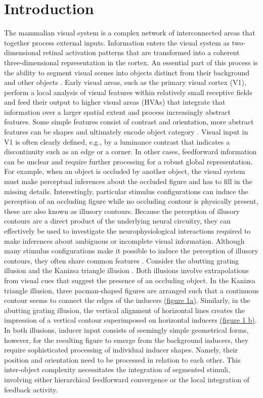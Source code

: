 \documentclass[12pt]{article}
\begin{document}
\section{Introduction}
The mammalian visual system is a complex network of interconnected areas that together process external inputs. Information enters the visual system as two-dimensional retinal activation patterns that are transformed into a coherent three-dimensional representation in the cortex. An essential part of this process is the ability to segment visual scenes into objects distinct from their background and other objects \autocite{kirchbergerEssentialRoleFeedback2020}. Early visual areas, such as the primary visual cortex (V1), perform a local analysis of visual features within relatively small receptive fields and feed their output to higher visual areas (HVAs) that integrate that information over a larger spatial extent and process increasingly abstract features. Some simple features consist of contrast and orientation, more abstract features can be shapes and ultimately encode object category \autocite{ashbridgeEffectImageOrientation2000}. Visual input in V1 is often clearly defined, e.g., by a luminance contrast that indicates a discontinuity such as an edge or a corner. In other cases, feedforward information can be unclear and require further processing for a robust global representation. For example, when an object is occluded by another object, the visual system must make perceptual inferences about the occluded figure and has to fill in the missing details. Interestingly, particular stimulus configurations can induce the perception of an occluding figure while no occluding contour is physically present, these are also known as illusory contours. Because the perception of illusory contours are a direct product of the underlying neural circuitry, they can effectively be used to investigate the neurophysiological interactions required to make inferences about ambiguous or incomplete visual information.
\bigbreak
Although many stimulus configurations make it possible to induce the perception of illusory contours, they often share common features \autocite{palmerLateInfluencesPerceptual2000}. Consider the abutting grating illusion \autocite{sorianoAbuttingGratingIllusion1996} and the Kanizsa triangle illusion \autocite{kanizsaSubjectiveContours1976}. Both illusions involve extrapolations from visual cues that suggest the presence of an occluding object. In the Kanizsa triangle illusion, three pacman-shaped figures are arranged such that a continuous contour seems to connect the edges of the inducers \hyperref[fig:figure_1]{(figure 1a)}. Similarly, in the abutting grating illusion, the vertical alignment of horizontal lines creates the impression of a vertical contour superimposed on horizontal inducers \hyperref[fig:figure_1]{(figure 1 b)}. In both illusions, inducer input consists of seemingly simple geometrical forms, however, for the resulting figure to emerge from the background inducers, they require sophisticated processing of individual inducer shapes. Namely, their position and orientation need to be processed in relation to each other. This inter-object complexity necessitates the integration of segmented stimuli, involving either hierarchical feedforward convergence or the local integration of feedback activity. 
\end{document}
